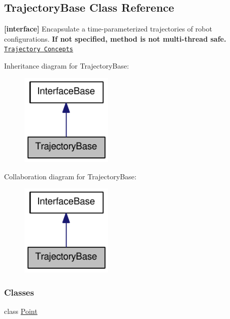 \hypertarget{classOpenRAVE_1_1TrajectoryBase}{
\subsection{TrajectoryBase Class Reference}
\label{classOpenRAVE_1_1TrajectoryBase}
}


{\bfseries \mbox{[}interface\mbox{]}} Encapsulate a time-\/parameterized trajectories of robot configurations. {\bfseries If not specified, method is not multi-\/thread safe.} \href{../main/architecture/trajectory.html}{\tt Trajectory Concepts}  




Inheritance diagram for TrajectoryBase:\nopagebreak
\begin{figure}[H]
\begin{center}
\leavevmode
\includegraphics[width=124pt]{classOpenRAVE_1_1TrajectoryBase__inherit__graph}
\end{center}
\end{figure}


Collaboration diagram for TrajectoryBase:\nopagebreak
\begin{figure}[H]
\begin{center}
\leavevmode
\includegraphics[width=124pt]{classOpenRAVE_1_1TrajectoryBase__coll__graph}
\end{center}
\end{figure}
\subsubsection*{Classes}
\begin{DoxyCompactItemize}
\item 
class \hyperlink{classOpenRAVE_1_1TrajectoryBase_1_1Point}{Point}
\end{DoxyCompactItemize}
